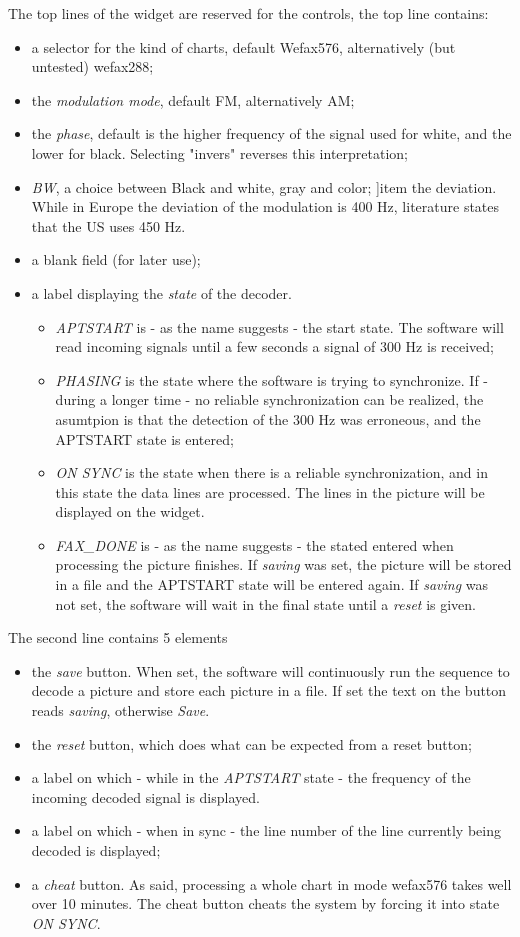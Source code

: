 \documentclass[11pt]{article}
\begin{document}
The top lines of the widget are reserved for the controls,
the top line contains:
\begin{itemize}
\item a selector for the kind of charts, default Wefax576, alternatively
(but untested) wefax288;
\item the {\em modulation mode}, default FM, alternatively AM;
\item the {\em phase}, default is the higher frequency of the signal
used for white, and the lower for black. Selecting "invers" reverses this
interpretation;
\item {\em BW}, a choice between Black and white, gray and color;
]item the {deviation}. While in Europe the deviation of the modulation is
400 Hz, literature states that the US uses 450 Hz.
\item a blank field (for later use);
\item a label displaying the {\em state} of the decoder. 
\begin{itemize}
\item {\em APTSTART} is - as the name suggests - the start state. The software
will read incoming signals until a few seconds a signal of 300 Hz
is received;
\item {\em PHASING} is the state where the software is trying to synchronize.
If - during a longer time - no reliable synchronization can be realized, the
asumtpion is that the detection of the 300 Hz was erroneous, and the APTSTART
state is entered;
\item {\em ON SYNC} is the state when there is a reliable synchronization, and
in this state the data lines are processed.
The lines in the picture will be displayed on the widget.
\item {\em FAX\_DONE} is - as the name suggests - the stated entered when
processing the picture finishes. If {\em saving} was set, the picture
will be stored in a file and the APTSTART state will be entered again.
If {\em saving} was not set, the software will wait in the final state
until a {\em reset} is given.
\end{itemize}
\end{itemize}
The second line contains 5 elements
\begin{itemize}
\item the {\em save} button. When set, the software will continuously
run the sequence to decode a picture and store each picture in a file.
If set the text on the button reads {\em saving}, otherwise {\em Save}.
\item the {\em reset} button, which does what
can be expected from a reset button;
\item a label on which - while in the {\em APTSTART} state - the frequency
of the incoming decoded signal is displayed.
\item a label on which - when in sync - the line number
of the line currently being decoded is displayed;
\item a {\em cheat} button. As said, processing a whole chart in mode wefax576
takes well over 10 minutes. The cheat button cheats the system by forcing
it into state {\em ON SYNC}.
\end{itemize}
\end{document}
